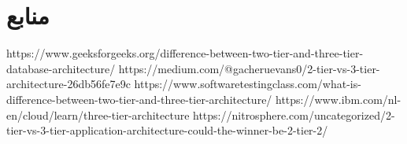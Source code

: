 \documentclass{article}
\begin{document}
\section*{منابع}
\renewcommand{\section}[2]{}%
\begin{thebibliography}{99} %


\begin{LTRitems}

\resetlatinfont

 https://www.geeksforgeeks.org/difference-between-two-tier-and-three-tier-database-architecture/
 https://medium.com/@gacheruevans0/2-tier-vs-3-tier-architecture-26db56fe7e9c
 https://www.softwaretestingclass.com/what-is-difference-between-two-tier-and-three-tier-architecture/
 https://www.ibm.com/nl-en/cloud/learn/three-tier-architecture
 https://nitrosphere.com/uncategorized/2-tier-vs-3-tier-application-architecture-could-the-winner-be-2-tier-2/
\end{LTRitems}

\end{thebibliography}
\end{document}
